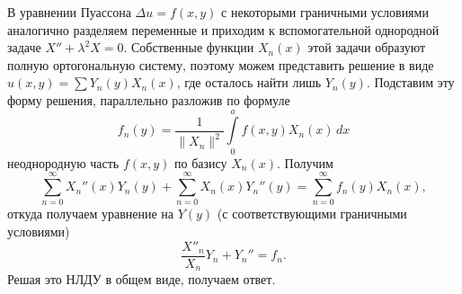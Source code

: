 В уравнении Пуассона $ \Delta u = f(x, y) $ с некоторыми граничными условиями
аналогично разделяем переменные и приходим к вспомогательной однородной задаче
$ X'' + \lambda^2 X = 0 $. Собственные функции $ X_n(x) $ этой задачи образуют
полную ортогональную систему, поэтому можем представить решение в виде $ u(x,
y)= \sum Y_n(y) X_n(x) $, где осталось найти лишь $ Y_n(y) $. Подставим эту
форму решения, параллельно разложив по формуле
\[
  f_n(y) = \frac{1}{\|X_n\|^2} \int\limits_{0}^{a}
  f(x, y) X_n(x)\,dx
\]
неоднородную часть $ f(x, y) $ по базису $ X_n(x) $. Получим  
\[
  \sum_{n=0}^\infty X_n''(x)Y_n(y) + \sum_{n=0}^\infty X_n(x)Y_n''(y) =
  \sum_{n=0}^\infty f_n(y)X_n(x),
\]
откуда получаем уравнение на $ Y(y) $ (с соответствующими граничными условиями)
\[
  \frac{X''_n}{X_n} Y_n + Y_n'' = f_n.
\]
Решая это НЛДУ в общем виде, получаем ответ.


